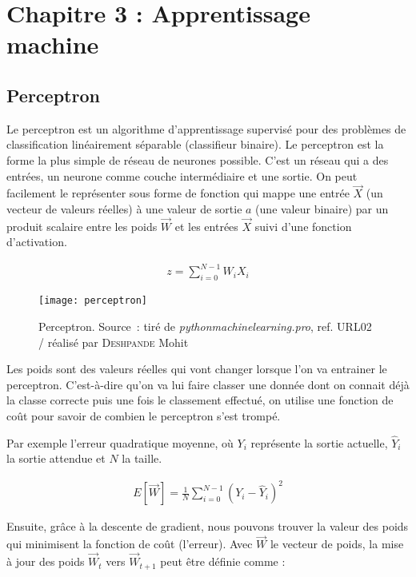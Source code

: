 \chapter{Chapitre 3 : Apprentissage machine}
\label{chap:3}

\section{Perceptron}
\label{sec:3.1}

Le perceptron est un algorithme d'apprentissage supervisé pour des problèmes de classification linéairement séparable (classifieur binaire). Le perceptron est la forme la plus simple de réseau de neurones possible. C'est un réseau qui a des entrées, un neurone comme couche intermédiaire et une sortie. On peut facilement le représenter sous forme de fonction qui mappe une entrée $\overrightarrow{X}$ (un vecteur de valeurs réelles) à une valeur de sortie $a$ (une valeur binaire) par un produit scalaire entre les poids $\overrightarrow{W}$ et les entrées $\overrightarrow{X}$ suivi d'une fonction d'activation.

{\Large
	\setlength{\abovedisplayskip}{-0.5cm}
	\begin{gather*}
		z = \sum_{i=0}^{N-1}{W_{i}X_{i}}
	\end{gather*}
}

\begin{figure}[H]
	\centering
	\texttt{[image: perceptron]}
	\caption[Perceptron]{Perceptron. Source : tiré de \textit{pythonmachinelearning.pro}, ref. URL02 / réalisé par \textsc{Deshpande} Mohit}
	\label{fig:perceptron}
\end{figure}

Les poids sont des valeurs réelles qui vont changer lorsque l’on va entrainer le perceptron. C’est-à-dire qu’on va lui faire classer une donnée dont on connait déjà la classe correcte puis une fois le classement effectué, on utilise une fonction de coût pour savoir de combien le perceptron s’est trompé. 

Par exemple l’erreur quadratique moyenne, où $Y_{i}$ représente la sortie actuelle, $\hat{Y}_{i}$ la sortie attendue et $N$ la taille.

{\Large
	\setlength{\abovedisplayskip}{-0.5cm}
	\begin{gather*}
		E[\overrightarrow{W}] = \frac{1}{N}\sum_{i=0}^{N-1}{(Y_{i} - \hat{Y}_{i})^2}
	\end{gather*}
}

Ensuite, grâce à la descente de gradient, nous pouvons trouver la valeur des poids qui minimisent la fonction de coût (l’erreur). Avec $\overrightarrow{W}$ le vecteur de poids, la mise à jour des poids $\overrightarrow{W}_t$ vers $\overrightarrow{W}_{t+1}$ peut être définie comme :

